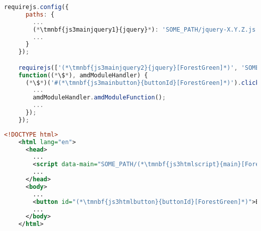 \begin{lstlisting}[language=JavaScript, title={Main JavaScript file \textit{\tmnbf{js3mainscript}{main}.js}}]
    requirejs.config({
      paths: {
        ...
        (*\tmnbf{js3mainjquery1}{jquery}*): 'SOME_PATH/jquery-X.Y.Z.js'
        ...
      }
    });

    requirejs(['(*\tmnbf{js3mainjquery2}{jquery}[ForestGreen]*)', 'SOME_PATH/amd_module'],
    function((*\$*), amdModuleHandler) {
      (*\$*)('#(*\tmnbf{js3mainbutton}{buttonId}[ForestGreen]*)').click(function() {
        ...
        amdModuleHandler.amdModuleFunction();
        ...
      });
    });
\end{lstlisting}
\begin{lstlisting}[language=XML, title={Web page file loading the JavaScript file}]
    <!DOCTYPE html>
    <html lang="en">
      <head>
        ...
        <script data-main="SOME_PATH/(*\tmnbf{js3htmlscript}{main}[ForestGreen]*)" src="SOME_OTHER_PATH/require.js"></script>
        ...
      </head>
      <body>
        ...
        <button id="(*\tmnbf{js3htmlbutton}{buttonId}[ForestGreen]*)">BUTTON_LABEL</button>
        ...
      </body>
    </html>
\end{lstlisting}
\newpage
